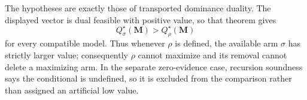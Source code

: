The hypotheses are exactly those of transported dominance duality.  The displayed vector is dual feasible with positive value, so that theorem gives
\[
Q_\sigma^\star(\mathbf M)>Q_\rho^\star(\mathbf M)
\]
for every compatible model.  Thus whenever \(\rho\) is defined, the available arm \(\sigma\) has strictly larger value; consequently \(\rho\) cannot maximize and its removal cannot delete a maximizing arm.  In the separate zero-evidence case, recursion soundness says the conditional is undefined, so it is excluded from the comparison rather than assigned an artificial low value.
